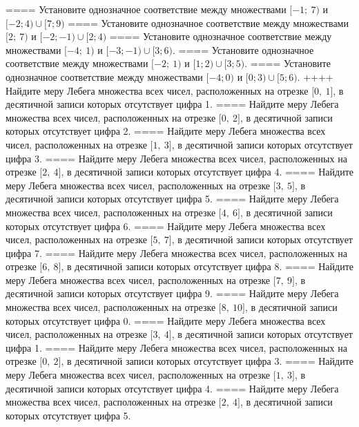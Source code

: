 ====
Установите однозначное соответствие между множествами \(\lbrack - 1;\ 7)\) и \(\lbrack - 2;4) \cup \lbrack 7;9)\)
====
Установите однозначное соответствие между множествами \(\lbrack 2;\ 7)\) и \(\lbrack - 2; - 1) \cup \lbrack 2;4)\)
====
Установите однозначное соответствие между множествами \(\lbrack - 4;\ 1)\) и \(\lbrack - 3; - 1) \cup \lbrack 3;6)\).
====
Установите однозначное соответствие между множествами \(\lbrack - 2;\ 1)\) и \(\lbrack 1;2) \cup \lbrack 3;5)\).
====
Установите однозначное соответствие между множествами \(\lbrack - 4;0)\) и \(\lbrack 0;3) \cup \lbrack 5;6)\).
++++
Найдите меру Лебега множества всех чисел, расположенных на отрезке \(\lbrack 0,\ 1\rbrack\), в десятичной записи которых отсутствует цифра 1.
====
Найдите меру Лебега множества всех чисел, расположенных на отрезке \(\lbrack 0,\ 2\rbrack\), в десятичной записи которых отсутствует цифра 2.
====
Найдите меру Лебега множества всех чисел, расположенных на отрезке \(\lbrack 1,\ 3\rbrack\), в десятичной записи которых отсутствует цифра 3.
====
Найдите меру Лебега множества всех чисел, расположенных на отрезке \(\lbrack 2,\ 4\rbrack\), в десятичной записи которых отсутствует цифра 4.
====
Найдите меру Лебега множества всех чисел, расположенных на отрезке \(\lbrack 3,\ 5\rbrack\), в десятичной записи которых отсутствует цифра 5.
====
Найдите меру Лебега множества всех чисел, расположенных на отрезке \(\lbrack 4,\ 6\rbrack\), в десятичной записи которых отсутствует цифра 6.
====
Найдите меру Лебега множества всех чисел, расположенных на отрезке \(\lbrack 5,\ 7\rbrack\), в десятичной записи которых отсутствует цифра 7.
====
Найдите меру Лебега множества всех чисел, расположенных на отрезке \(\lbrack 6,\ 8\rbrack\), в десятичной записи которых отсутствует цифра 8.
====
Найдите меру Лебега множества всех чисел, расположенных на отрезке \(\lbrack 7,\ 9\rbrack\), в десятичной записи которых отсутствует цифра 9.
====
Найдите меру Лебега множества всех чисел, расположенных на отрезке \(\lbrack 8,\ 10\rbrack\), в десятичной записи которых отсутствует цифра 0.
====
Найдите меру Лебега множества всех чисел, расположенных на отрезке \(\lbrack 3,\ 4\rbrack\), в десятичной записи которых отсутствует цифра 1.
====
Найдите меру Лебега множества всех чисел, расположенных на отрезке \(\lbrack 0,\ 2\rbrack\), в десятичной записи которых отсутствует цифра 3.
====
Найдите меру Лебега множества всех чисел, расположенных на отрезке \(\lbrack 1,\ 3\rbrack\), в десятичной записи которых отсутствует цифра 4.
====
Найдите меру Лебега множества всех чисел, расположенных на отрезке \(\lbrack 2,\ 4\rbrack\), в десятичной записи которых отсутствует цифра 5.
